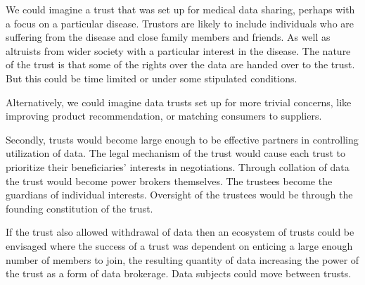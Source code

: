 \documentclass[a4paper]{caesar_book}
\begin{document}
We could imagine a trust that was set up for medical data sharing, perhaps with a focus on a particular disease. Trustors are likely to include individuals who are suffering from the disease and close family members and friends. As well as altruists from wider society with a particular interest in the disease. The nature of the trust is that some of the rights over the data are handed over to the trust. But this could be time limited or under some stipulated conditions.

Alternatively, we could imagine data trusts set up for more trivial concerns, like improving product recommendation, or matching consumers to suppliers.

Secondly, trusts would become large enough to be effective partners in controlling utilization of data. The legal mechanism of the trust would cause each trust to prioritize their beneficiaries’ interests in negotiations. Through collation of data the trust would become power brokers themselves. The trustees become the guardians of individual interests. Oversight of the trustees would be through the founding constitution of the trust.

If the trust also allowed withdrawal of data then an ecosystem of trusts could be envisaged where the success of a trust was dependent on enticing a large enough number of members to join, the resulting quantity of data increasing the power of the trust as a form of data brokerage. Data subjects could move between trusts.
\end{document}
